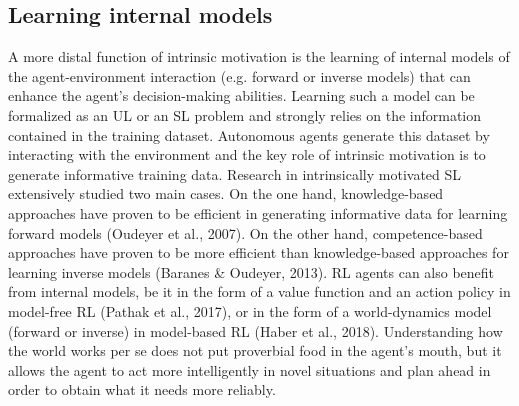\subsection{Learning internal models} A more distal function of intrinsic motivation is the learning of internal models of the agent-environment interaction (e.g. forward or inverse models) that can enhance the agent’s decision-making abilities. Learning such a model can be formalized as an \ac{UL} or an \ac{SL} problem and strongly relies on the information contained in the training dataset. Autonomous agents generate this dataset by interacting with the environment and the key role of intrinsic motivation is to generate informative training data. Research in intrinsically motivated \ac{SL} extensively studied two main cases. On the one hand, knowledge-based approaches have proven to be efficient in generating informative data for learning forward models (Oudeyer et al., 2007). On the other hand, competence-based approaches have proven to be more efficient than knowledge-based approaches for learning inverse models (Baranes \& Oudeyer, 2013). \ac{RL} agents can also benefit from internal models, be it in the form of a value function and an action policy in model-free \ac{RL} (Pathak et al., 2017), or in the form of a world-dynamics model (forward or inverse) in model-based \ac{RL} (Haber et al., 2018). Understanding how the world works per se does not put proverbial food in the agent’s mouth, but it allows the agent to act more intelligently in novel situations and plan ahead in order to obtain what it needs more reliably.

